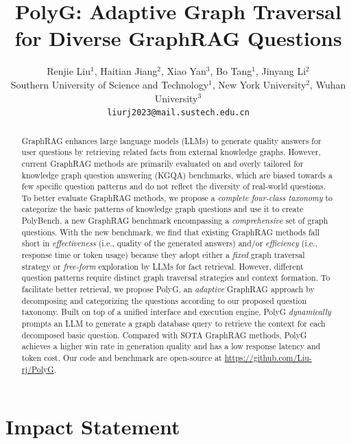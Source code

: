 \documentclass{article}
\title{PolyG: Adaptive Graph Traversal for Diverse GraphRAG Questions}
\author{
Renjie Liu$^1$, Haitian Jiang$^2$, Xiao Yan$^3$, Bo Tang$^1$, Jinyang Li$^2$ \\
Southern University of Science and Technology$^1$, New York University$^2$, Wuhan University$^3$ \\
\texttt{liurj2023@mail.sustech.edu.cn}
}
\newcommand{\name}{{PolyG}} %
\newcommand{\benchmarkname}{{PolyBench}} %
\begin{document}
\maketitle


\begin{abstract}
GraphRAG enhances large language models (LLMs) to generate quality answers for user questions by retrieving related facts from external knowledge graphs. However, current GraphRAG methods are primarily evaluated on and overly tailored for knowledge graph question answering (KGQA) benchmarks, which are biased towards a few specific question patterns and do not reflect the diversity of real-world questions. To better evaluate GraphRAG methods, we propose a \textit{complete four-class taxonomy} to categorize the basic patterns of knowledge graph questions and use it to create \benchmarkname{}, a new GraphRAG benchmark encompassing a \textit{comprehensive} set of graph questions. With the new benchmark, we find that existing GraphRAG methods fall short in \textit{effectiveness} (i.e., quality of the generated answers) and/or \textit{efficiency} (i.e., response time or token usage) because they adopt either a \textit{fixed} graph traversal strategy or \textit{free-form} exploration by LLMs for fact retrieval. However, different question patterns require distinct graph traversal strategies and context formation. To facilitate better retrieval, we propose \name{}, an \textit{adaptive} GraphRAG approach by decomposing and categorizing the questions according to our proposed question taxonomy. Built on top of a unified interface and execution engine, \name{} \textit{dynamically} prompts an LLM to generate a graph database query to retrieve the context for each decomposed basic question. Compared with SOTA GraphRAG methods, \name{} achieves a higher win rate in generation quality and has a low response latency and token cost. Our code and benchmark are open-source at \url{https://github.com/Liu-rj/PolyG}.
\end{abstract}








% 




\newpage

\appendix
\section{Impact Statement}\label{sec:broader_impact}
\end{document}
